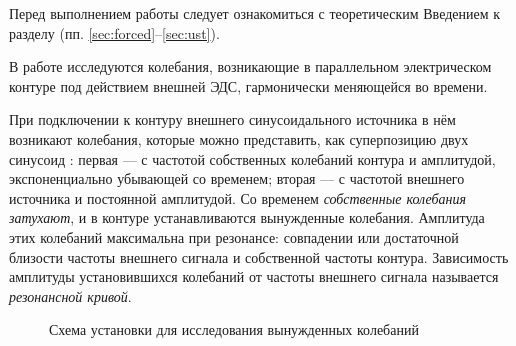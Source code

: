 


Перед выполнением работы следует ознакомиться с теоретическим Введением
к разделу (пп. \ref{sec:forced}--\ref{sec:ust}).

В работе исследуются колебания, возникающие в параллельном электрическом 
контуре под действием внешней ЭДС, гармонически меняющейся во времени.

При подключении к контуру внешнего синусоидального источника в нём 
возникают колебания, которые можно представить, как суперпозицию двух 
синусоид : первая --- с частотой собственных колебаний контура и 
амплитудой, экспоненциально убывающей со временем; вторая --- с частотой 
внешнего источника и постоянной амплитудой. Со временем \emph{собственные 
колебания затухают}, и в контуре устанавливаются вынужденные колебания. 
Амплитуда этих колебаний максимальна при резонансе: совпадении или 
достаточной близости частоты внешнего сигнала и собственной 
частоты контура. Зависимость амплитуды установившихся колебаний от 
частоты внешнего сигнала называется \emph{резонансной кривой}.


\begin{wrapfigure}[13]{r}{0.45\linewidth}
	\caption{Схема установки для исследования вынужденных колебаний}
\end{wrapfigure}



